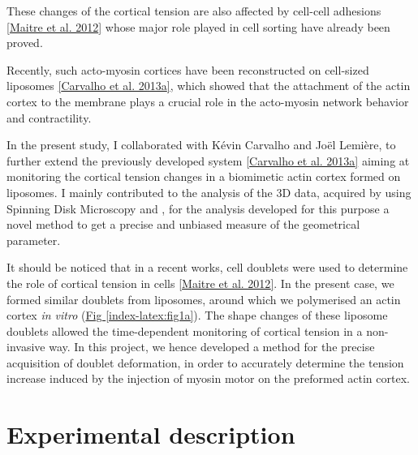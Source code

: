 \documentclass[A4paperpaper,11pt,english]{sphinxmanual}
\begin{document}
These changes of the cortical tension are also affected by cell-cell
adhesions {\hyperref[index-latex:maitre2012]{{[}Maitre et al. 2012{]}}} whose major role played in cell sorting have already been proved.

Recently, such acto-myosin cortices have been reconstructed on cell-sized
liposomes {\hyperref[index-latex:carvalho2013a]{{[}Carvalho et al. 2013a{]}}}, which showed that the attachment of the actin
cortex to the membrane plays a crucial role in the acto-myosin network behavior and contractility.

In the present study, I collaborated with Kévin Carvalho and Joël Lemière, to
further extend the previously developed system {\hyperref[index-latex:carvalho2013a]{{[}Carvalho et al. 2013a{]}}}
aiming at monitoring the cortical tension changes in a biomimetic actin cortex formed
on liposomes. I mainly contributed to the analysis of the 3D data, acquired by using Spinning Disk Microscopy and , for the analysis developed for this purpose a
novel method to get a precise and unbiased measure of the geometrical
parameter.

It should be noticed that in a recent works, cell doublets were used to determine the role of cortical tension in cells {\hyperref[index-latex:maitre2012]{{[}Maitre et al. 2012{]}}}. In the present case, we formed similar doublets from liposomes,
around which we polymerised an actin cortex \emph{in vitro} (\hyperref[index-latex:fig1a]{Fig  \ref*{index-latex:fig1a}}). The
shape changes of these liposome doublets allowed the time-dependent monitoring of
cortical tension in a non-invasive way.  In this project, we hence developed a
method for the precise acquisition of doublet deformation, in order to accurately determine
the tension increase induced by the injection of myosin motor on
the preformed actin cortex.


\section{Experimental description}
\label{index-latex:experimental-description}
\end{document}

